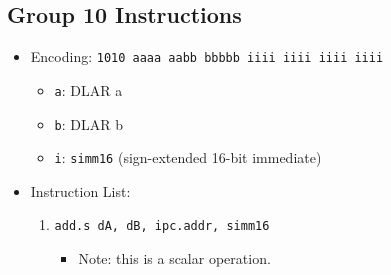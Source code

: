 \documentclass{article}
\begin{document}
	\subsection{Group 10 Instructions}
		\begin{itemize}
		\item Encoding: \texttt{1010 aaaa aabb bbbbb  iiii iiii iiii iiii}
			\begin{itemize}
			\item \texttt{a}: DLAR a
			\item \texttt{b}: DLAR b
			\item \texttt{i}: \texttt{simm16} (sign-extended 16-bit
				immediate)
			\end{itemize}
		\item Instruction List:
			\begin{enumerate}
			\item \texttt{add.s dA, dB, ipc.addr, simm16}
				\begin{itemize}
				\item Note: this is a scalar operation.
				\end{itemize}
			\end{enumerate}
		\end{itemize}



\end{document}
